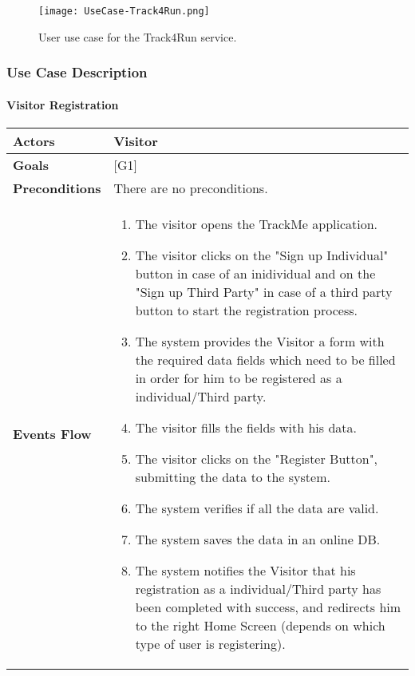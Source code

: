 \documentclass[12pt]{article}
\begin{document}
\begin{figure}[H]
\texttt{[image: UseCase-Track4Run.png]}
\centering
\label{fig:UseCase-Track4Run}
\caption{User use case for the Track4Run service.}
\end{figure}

\subsubsection{Use Case Description}
\paragraph{Visitor Registration}

\begin{center}
    \begin{tabular} { |p{}|p{}| }
        \hline
        \textbf{Actors} & Visitor \\ 
        \hline
        \textbf{Goals} & {[G1]} \\ 
        \hline  
        \textbf{Preconditions} & There are no preconditions. \\ 
        \hline
        \textbf{Events Flow} & \begin{enumerate}[topsep=0pt]
                            \setlength{\itemsep}{0.5pt}
                            \item The visitor opens the TrackMe application.
                            \item The visitor clicks on the "Sign up Individual" button in case of an inidividual and on the "Sign up Third Party" in case of a third party button to start the registration process.
                            \item The system provides the Visitor a form with the required data fields which need to be filled in order for him to be registered as a individual/Third party.
                            \item The visitor fills the fields with his data. 
                            \item The visitor clicks on the "Register Button", submitting the data to the system.
                            \item The system verifies if all the data are valid.
                            \item The system saves the data in an online DB.
                            \item The system notifies the Visitor that his registration as a individual/Third party has been completed with success, and redirects him to the right Home Screen (depends on which type of user is registering).

\end{enumerate}
\end{tabular}
\end{center}
\end{document}

